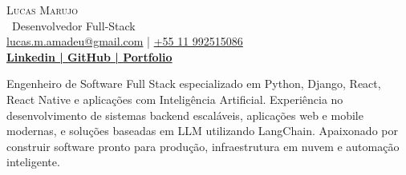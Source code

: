 


    \vspace*{-40pt}

    \vspace*{-2pt}
    \begin{center}
        {\Huge \scshape {Lucas Marujo}}\\
        \vspace*{2pt}
        \ {Desenvolvedor Full-Stack}\\
        \vspace*{2pt}
        \href{mailto:lucas.m.amadeu@gmail.com}{lucas.m.amadeu@gmail.com} | \href{tel:+55 11 992515086}{+55 11 992515086}\\
        \vspace*{4pt}
        \textbf{\href{https://www.linkedin.com/in/lucas-amadeu/}{Linkedin | }}\textbf{\href{http://github.com/lucasmarujo}{GitHub | }}\textbf{\href{https://marujo.dev/}{Portfolio}}\\
    \end{center}

    \vspace{2mm}
    Engenheiro de Software Full Stack especializado em Python, Django, React, React Native e aplicações com Inteligência Artificial. Experiência no desenvolvimento de sistemas backend escaláveis, aplicações web e mobile modernas, e soluções baseadas em LLM utilizando LangChain. Apaixonado por construir software pronto para produção, infraestrutura em nuvem e automação inteligente.
    \vspace{2mm}

    \vspace{2mm}


